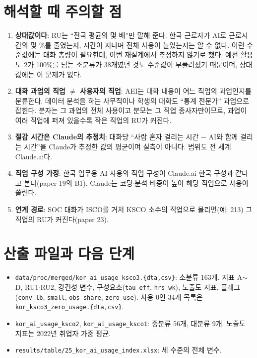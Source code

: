 \documentclass[11pt]{article}
\begin{document}
\section{해석할 때 주의할 점}\label{sec:level}

\begin{enumerate}[leftmargin=*]
  \item \textbf{상대값이다}: RU는 ``전국 평균의 몇 배''만 말해 준다. 한국 근로자가 AI로 근로시간의 몇 \%를 줄였는지, 시간이 지나며 전체 사용이 늘었는지는 알 수 없다. 이런 수준값에는 대화 총량이 필요한데, 이번 재설계에서 추정하지 않기로 했다. 예전 활용도 2가 100\%를 넘는 소분류가 38개였던 것도 수준값이 부풀려졌기 때문이며, 상대값에는 이 문제가 없다.
  \item \textbf{대화 과업의 직업 $\neq$ 사용자의 직업}: AEI는 대화 내용이 어느 직업의 과업인지를 분류한다. 데이터 분석을 하는 사무직이나 학생의 대화도 ``통계 전문가'' 과업으로 잡힌다. 분자는 그 과업의 전체 사용이고 분모는 그 직업 종사자만이므로, 과업이 여러 직업에 퍼져 있을수록 작은 직업의 RU가 커진다.
  \item \textbf{절감 시간은 Claude의 추정치}: 대화당 ``사람 혼자 걸리는 시간 $-$ AI와 함께 걸리는 시간''을 Claude가 추정한 값의 평균이며 실측이 아니다. 범위도 전 세계 Claude.ai다.
  \item \textbf{직업 구성 가정}: 한국 업무용 AI 사용의 직업 구성이 Claude.ai 한국 구성과 같다고 본다(paper 19의 B1). Claude는 코딩$\cdot$분석 비중이 높아 해당 직업으로 사용이 쏠린다.
  \item \textbf{연계 경로}: SOC 대화가 ISCO를 거쳐 KSCO 소수의 직업으로 몰리면(예: 213) 그 직업의 RU가 커진다(paper 23).
\end{enumerate}

\section{산출 파일과 다음 단계}

\begin{itemize}[leftmargin=*]
  \item \texttt{data/proc/merged/kor\_ai\_usage\_ksco3.\{dta,csv\}}: 소분류 163개. 지표 A$\sim$D, RU1$\cdot$RU2, 강건성 변수, 구성요소(\texttt{tau\_eff}, \texttt{hrs\_wk}), 노출도 지표, 플래그(\texttt{conv\_lb}, \texttt{small}, \texttt{obs\_share}, \texttt{zero\_use}). 사용 0인 34개 목록은 \texttt{kor\_ksco3\_zero\_usage.\{dta,csv\}}.
  \item \texttt{kor\_ai\_usage\_ksco2}, \texttt{kor\_ai\_usage\_ksco1}: 중분류 56개, 대분류 9개. 노출도 지표는 2022년 취업자 가중 평균.
  \item \texttt{results/table/25\_kor\_ai\_usage\_index.xlsx}: 세 수준의 전체 변수.
\end{itemize}
\end{document}
